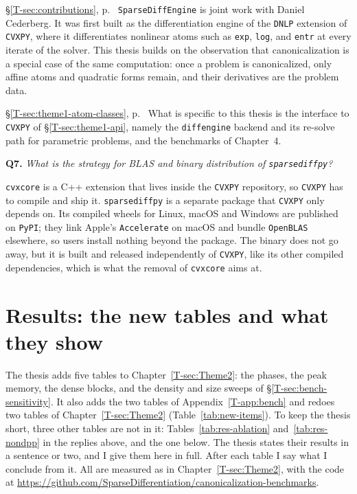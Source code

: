 \documentclass[letterpaper,12pt]{article}
\newcommand{\ac}[1]{#1}
\newcommand{\tsec}[1]{\S\ref{T-#1}}
\newcommand{\tpage}[1]{p.~\pageref{T-#1}}
\newcommand{\tref}[1]{\tsec{#1}, \tpage{#1}}
\newcommand{\question}[2]{\FloatBarrier\par\bigskip\textbf{Q#1.} \emph{#2}\par}
\begin{document}
\begin{thesisquote}{\tref{sec:contributions}}
\texttt{SparseDiffEngine} is joint work with Daniel Cederberg. It was first built as the
differentiation engine of the
\texttt{DNLP} extension of \texttt{CVXPY}, where it differentiates nonlinear atoms such as
\texttt{exp}, \texttt{log}, and \texttt{entr} at every iterate of the solver. This thesis builds
on the observation that canonicalization is a special case of the same computation: once a
problem is canonicalized, only affine atoms and quadratic forms remain, and their derivatives
are the problem data.
\end{thesisquote}
\begin{thesisquote}{\tref{sec:theme1-atom-classes}}
What is specific to this thesis is the interface to \texttt{CVXPY} of \tsec{sec:theme1-api}, namely the
\texttt{diffengine} backend and its re-solve path for parametric problems, and the benchmarks of
Chapter~4.
\end{thesisquote}

\question{7}{What is the strategy for \ac{BLAS} and binary distribution of
\texttt{sparsediffpy}?}
\texttt{cvxcore} is a C++ extension that lives inside the \texttt{CVXPY} repository, so
\texttt{CVXPY} has to compile and ship it. \texttt{sparsediffpy} is a separate package that
\texttt{CVXPY} only depends on. Its compiled wheels for Linux, macOS and Windows are published
on \texttt{PyPI}; they link Apple's \texttt{Accelerate} on macOS and bundle \texttt{OpenBLAS}
elsewhere, so users install nothing beyond the package. The binary does not go away, but it is
built and released independently of \texttt{CVXPY}, like its other compiled dependencies, which
is what the removal of \texttt{cvxcore} aims at.


\section{Results: the new tables and what they show}\label{sec:results}

The thesis adds five tables to Chapter~\ref{T-sec:Theme2}: the phases, the peak memory, the dense
blocks, and the density and size sweeps of \tsec{sec:bench-sensitivity}. It also adds the two
tables of Appendix~\ref{T-app:bench} and redoes two tables of Chapter~\ref{T-sec:Theme2}
(Table~\ref{tab:new-items}). To keep the thesis short, three other tables are not in it:
Tables~\ref{tab:res-ablation} and~\ref{tab:res-nondpp} in the replies above, and the one
below. The thesis states their results in a sentence or two, and I give them here in full. After each table
I say what I conclude from it. All are measured as in Chapter~\ref{T-sec:Theme2},
with the code at \url{https://github.com/SparseDifferentiation/canonicalization-benchmarks}.
\end{document}
